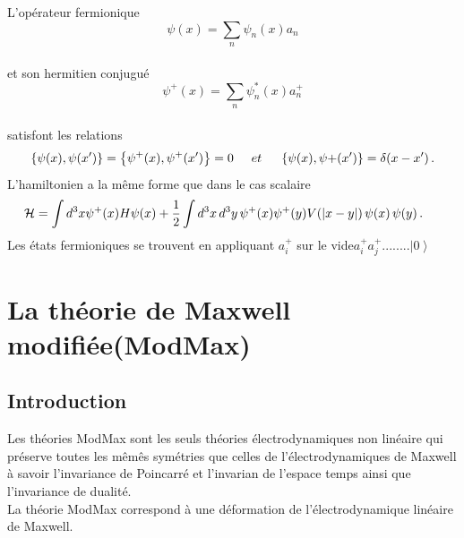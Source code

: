 \documentclass[12pt,a4paper, openany]{report}
\begin{document}
\begin{flushleft}
\begin{itemize}
\begin{flushleft}
\begin{itemize}
\par L'opérateur fermionique\\ 
$$\psi(x)=\sum_{n}{\psi}_n(x)a_n $$ \\
et son hermitien conjugué 
$$\psi^{+}(x)=\sum_{n}{\psi}^{*}_n(x)a^{+}_n $$ \\
satisfont les relations \\
\begin{equation}
	\left\{\psi(x),\psi(x')\right\}=\left\{\psi^{+}(x),
	\psi^{+}(x')\right\}=0 \hspace{0.5cm} et \hspace{0.5cm} \left\{\psi(x),
	\psi{+}(x')\right\}=\delta(x-x')\,.
\end{equation}
L'hamiltonien a la m\^{e}me forme que dans le cas scalaire 
\begin{equation}
	\hspace{-0.5cm} \mathcal{H}=\int d^{3}x\psi^{+}(x)H\psi(x)+\frac{1}{2}\int d^{3}x\,d^{3}y\,\psi^{+}(x)\psi^{+}(y)V(\left|x-y\right|)\,\psi(x)\,\psi(y)\,.
\end{equation}
Les états fermioniques se trouvent en appliquant $a^{+}_i$ sur le vide\hspace{0.1cm}$a^{+}_ia^{+}_j........\left|0\right\rangle$

\end{itemize}
\setlength\parindent{0mm}
\end{flushleft}

\end{itemize}
\setlength\parindent{0mm}
\end{flushleft}


	
	
	\chapter{La théorie de Maxwell modifiée(ModMax)}
	
	\section{Introduction}
	Les théories ModMax sont les seuls théories électrodynamiques non linéaire qui préserve toutes les m\^{e}m\^{e}s symétries que celles de l'électrodynamiques de Maxwell à  savoir l'invariance de Poincarré et l'invarian de l'espace temps ainsi que l'invariance de dualité.\\
	La théorie ModMax correspond à une déformation de l'électrodynamique linéaire de Maxwell.
	
\end{document}
